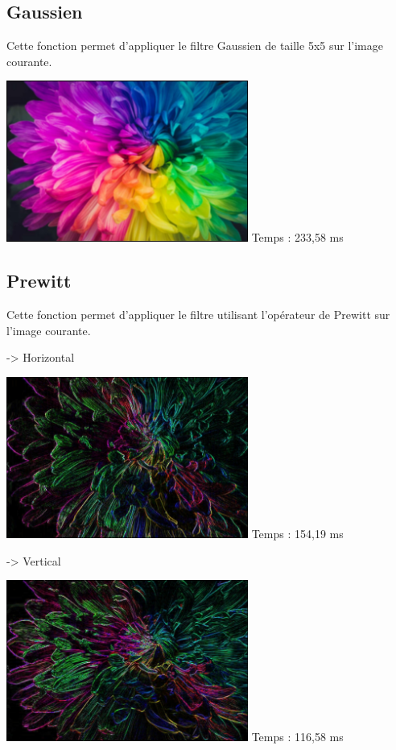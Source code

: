 \documentclass{article}
\begin{document}
\subsection{Gaussien}
Cette fonction permet d'appliquer le filtre Gaussien de taille 5x5 sur l'image courante.
\medbreak

\begin{center}
    \medbreak
    \includegraphics[width=300px]{./Images/Multicolor/Gaussian_15.jpg}
    \bigbreak
    Temps  : 233,58 ms
\end{center}
\bigbreak

\subsection{Prewitt}
Cette fonction permet d'appliquer le filtre utilisant l'opérateur de Prewitt sur l'image courante.
\medbreak

-> Horizontal
\begin{center}
    \medbreak
    \includegraphics[width=300px]{./Images/Multicolor/Prewitt_Hor.jpg}
    \bigbreak
    Temps  : 154,19 ms
\end{center}
\medbreak

-> Vertical
\begin{center}
    \medbreak
    \includegraphics[width=300px]{./Images/Multicolor/Prewitt_Ver.jpg}
    \bigbreak
    Temps  : 116,58 ms
\end{center}
\medbreak
\end{document}
